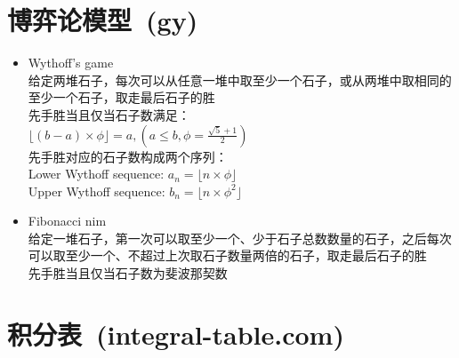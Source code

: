 \section{博弈论模型\ \small(gy)}
	\begin{itemize}
		\item Wythoff's game
			\\给定两堆石子，每次可以从任意一堆中取至少一个石子，或从两堆中取相同的至少一个石子，取走最后石子的胜
			\\先手胜当且仅当石子数满足：
			\\$\lfloor (b - a) \times \phi \rfloor=a, (a \leq b, \phi = \frac{\sqrt{5} + 1}{2})$
			\\先手胜对应的石子数构成两个序列：
			\\Lower Wythoff sequence: $a_n = \lfloor n \times \phi \rfloor$
			\\Upper Wythoff sequence: $b_n = \lfloor n \times \phi ^ 2 \rfloor$
		\item Fibonacci nim
			\\给定一堆石子，第一次可以取至少一个、少于石子总数数量的石子，之后每次可以取至少一个、不超过上次取石子数量两倍的石子，取走最后石子的胜
			\\先手胜当且仅当石子数为斐波那契数
	\end{itemize}
\section{积分表\ \small(integral-table.com)}
	\begin{multicols}{2}
		
	\end{multicols}